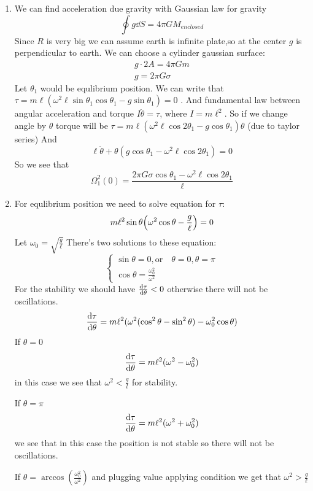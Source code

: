 \begin{sol}
    \begin{enumerate}[label=\textbf{(\alph*)}]
        \item 
        We can find acceleration due gravity with Gaussian law for gravity $$\oint g\dd S=4\pi GM_{enclosed}$$
        Since $R$ is very big we can assume earth is infinite plate,so at the center $g$ is perpendicular to earth. We can choose a cylinder gaussian surface:
        \begin{align*}
            g\cdot 2A=4\pi Gm\\
            g=2\pi G\sigma
        \end{align*}
        Let $\theta_1$ would  be equlibrium position. We can write that $\tau=m\ell(\omega^2\ell\sin\theta_1\cos\theta_1-g\sin\theta_1)=0$
        . And fundamental law between angular acceleration and torque $I\ddot{\theta}=\tau$, where $I=m\ell^2$. So if we change angle by $\theta$ torque will be $\tau=m\ell(\omega^2\ell\cos 2\theta_1-g\cos\theta_1)\theta$ (due to taylor series)
        And $$\ell\ddot{\theta}+\theta(g\cos\theta_1-\omega^2\ell\cos 2\theta_1)=0$$ So we see that $$\Omega_1^2(0)=\frac{2\pi G\sigma\cos\theta_1-\omega^2\ell\cos 2\theta_1}{\ell}$$
        \item
        For equlibrium position we need to solve equation for 
        $\tau$:
        $$m\ell^2\sin\theta \qty(\omega^2\cos\theta-\frac{g}{\ell})=0$$
        Let $\omega_0=\sqrt{\frac{g}{\ell}}$ There's two solutions to these equation: 
        $$\begin{cases}
            \sin\theta=0,\text{or} \quad \theta=0 , \theta=\pi\\
            \cos\theta=\frac{\omega_0^2}{\omega^2}
        \end{cases}$$
        For the stability we should have $\dv{\tau}{\theta}<0$ otherwise there will not be oscillations.
         $$\dv{\tau}{\theta}=m\ell^2(\omega^2(\cos^2\theta-\sin^2\theta)-\omega_0^2\cos\theta)$$
        If $\theta=0$ $$\dv{\tau}{\theta}=m\ell^2(\omega^2-\omega_0^2)$$ in this case we see that $\omega^2<\frac{g}{l}$ for stability.

        If $\theta=\pi$ $$\dv{\tau}{\theta}=m\ell^2(\omega^2+\omega_0^2)$$ we see that in this case the position is not stable so there will not be oscillations.
        
        If $\theta=\arccos(\frac{\omega_0^2}{\omega^2})$ and plugging value applying condition we get that $\omega^2>\frac{g}{\ell}$ 


\end{enumerate}
\end{sol}

